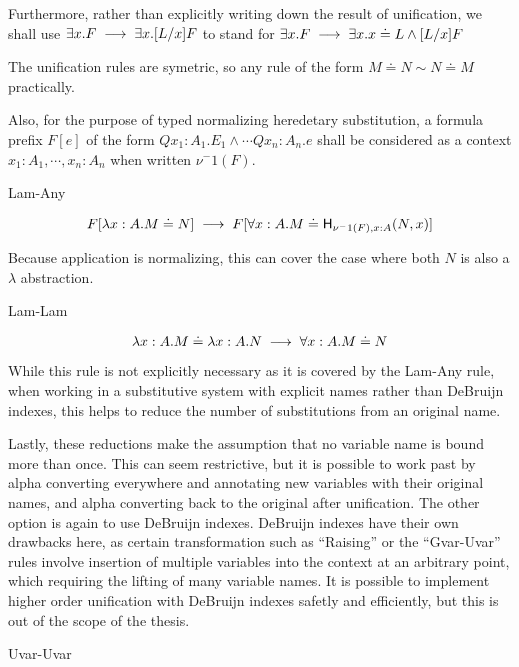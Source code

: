 Furthermore, rather than explicitly writing down the result of unification, 
we shall use $\exists x. F \;\longrightarrow\; \exists x . [ L / x] F$ 
to stand for $\exists x. F \;\longrightarrow\; \exists x . x \doteq L \wedge [ L / x] F$

The unification rules are symetric, so any rule of the form 
$M \doteq N \sim N \doteq M$ practically.

Also, for the purpose of typed normalizing heredetary substitution, 
a formula prefix $F[e]$ of the form 
$Qx_1:A_1 . E_1\wedge \cdots Qx_n : A_n . e$ shall be considered as a context
$x_1 : A_1 ,\cdots ,x_n : A_n$ when written $\nu^-1(F)$.

\setcounter{tcase}{0}

\begin{tcase}
Lam-Any
\end{tcase}

\[
F[\lambda x : A . M \doteq N]
\;\longrightarrow\;
F[\forall x : A . M \doteq \mathsf{H}_{\nu^-1(F),x:A}(N , x)]
\]

Because application is normalizing, this can cover the case where both $N$ is also a $\lambda$ 
abstraction.

\begin{tcase}
Lam-Lam
\end{tcase}

\[
\lambda x : A . M \doteq \lambda x : A . N
\;\longrightarrow\;
\forall x : A . M \doteq N
\]

While this rule is not explicitly necessary as it is covered by the Lam-Any rule, 
when working
in a substitutive system with explicit names rather than DeBruijn indexes, 
this helps to reduce the number of substitutions from an original name. 

Lastly, these reductions make the 
assumption that no variable name is bound more than once.
This can seem restrictive, but it is possible to 
work past by alpha converting everywhere and annotating
new variables with their original names, and alpha converting
back to the original after unification. The other option is again
to use DeBruijn indexes.  DeBruijn indexes have their own drawbacks
here, as certain transformation such as ``Raising''
or the ``Gvar-Uvar'' rules involve insertion of multiple
variables into the context at an arbitrary point, 
which requiring the lifting of many variable names.  
It is possible to implement higher order unification
with DeBruijn indexes safetly and efficiently, 
but this is out of the scope of the thesis.

\begin{tcase}
Uvar-Uvar
\end{tcase}

